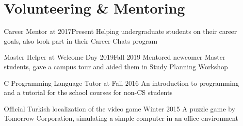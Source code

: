 
\section{Volunteering \& Mentoring}

\begin{denseouterlist}

\entrymid
{Career Mentor at }{2017\textendash Present} %
{Helping undergraduate students on their career goals, also took part in their Career Chats program}

\entrymid
{Master Helper at  Welcome Day 2019}{Fall 2019}
{Mentored newcomer Master students, gave a campus tour and aided them in Study Planning Workshop}

\entrymid
{C Programming Language Tutor at }{Fall 2016}
{An introduction to programming and a tutorial for the school courses for non-CS students}

\entrymid
{Official Turkish localization of the video game }{Winter 2015}
{A puzzle game by Tomorrow Corporation, simulating a simple computer in an office environment}

\end{denseouterlist}
